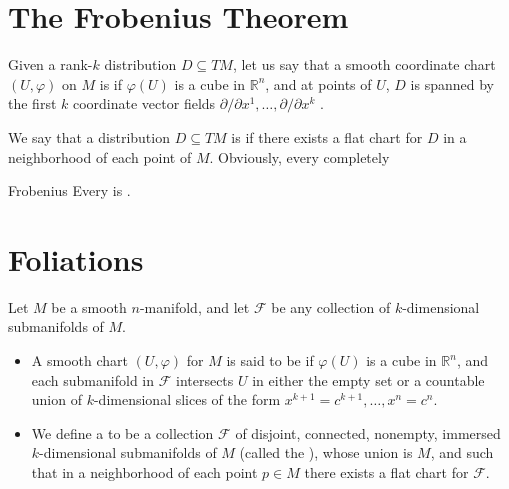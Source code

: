 \documentclass[../main.tex]{subfiles}
\begin{document}
\section{ The Frobenius Theorem}

\begin{definition}{}{}
     Given a rank-$k$ distribution $D \subseteq TM$, let us say that a smooth coordinate chart $(U, \varphi)$ on $M$ is  if $\varphi(U)$ is a cube in $\mathbb{R}^n$, and at points of $U$, $D$ is spanned by the first $k$ coordinate vector fields $\partial/\partial x^1, \dots, \partial/\partial x^k$ .

\end{definition}

\begin{definition}{}{}
    We say that a distribution $D \subseteq TM$ is  if there exists a flat chart for $D$ in a neighborhood of each point of $M$. Obviously, every completely
\end{definition}

\begin{theorem}{Frobenius}{}
Every  is .
\end{theorem}

\section{Foliations}

\begin{definition}{}{}
   Let \(  M  \) be a smooth \(  n  \)-manifold, and let \(  \mathscr{F}  \) be any collection of \(  k  \)-dimensional submanifolds of \(  M  \). 
   \begin{itemize}
    \item  A smooth chart $(U,\varphi)$ for $M$ is said to be  if $\varphi(U)$ is a cube in $\mathbb{R}^n$, and each submanifold in $\mathcal{F}$ intersects $U$ in either the empty set or a countable union of $k$-dimensional slices of the form $x^{k+1} = c^{k+1}, \dots, x^n = c^n$.
    \item We define a  to be a collection $\mathcal{F}$ of disjoint, connected, nonempty, immersed $k$-dimensional submanifolds of $M$ (called the ), whose union is $M$, and such that in a neighborhood of each point $p \in M$ there exists a flat chart for $\mathcal{F}$.
   \end{itemize}
    
\end{definition}
\end{document}
